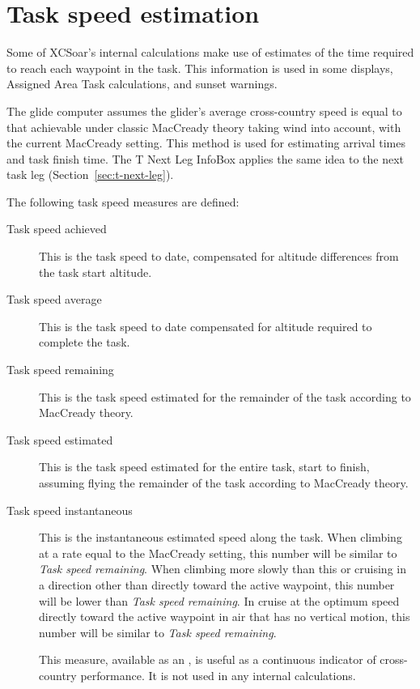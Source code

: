 \section{Task speed estimation}\label{sec:task-speed-estim}

Some of XCSoar's internal calculations make use of estimates of the
time required to reach each waypoint in the task.  This information is
used in some {\InfoBox} displays, Assigned Area Task calculations, and
sunset warnings.

The glide computer assumes the glider's average cross-country speed is
equal to that achievable under classic MacCready theory taking wind
into account, with the current MacCready setting.  This method is used
for estimating arrival times and task finish time.  The T Next Leg
InfoBox applies the same idea to the next task leg
(Section~\ref{sec:t-next-leg}).

The following task speed measures are defined:
\begin{description}
\item[Task speed achieved]  This is the task speed to date, compensated
for altitude differences from the task start altitude.
\item[Task speed average]  This is the task speed to date compensated
for altitude required to complete the task.
\item[Task speed remaining]  This is the task speed estimated for the
  remainder of the task according to MacCready theory.
\item[Task speed estimated]  This is the task speed estimated for the entire 
task, start to finish, assuming flying the remainder of the task according 
to MacCready theory.
\item[Task speed instantaneous]  This is the instantaneous estimated speed 
along the task.  When climbing at a rate equal to the MacCready setting, this 
number will be similar to \emph{Task speed remaining}.  When climbing more slowly 
than this or cruising in a direction other than directly toward the active 
waypoint, this number will be lower than \emph{Task speed remaining}.  In cruise 
at the optimum speed directly toward the active waypoint in air that has no 
vertical motion, this number will be similar to \emph{Task speed remaining}.

This measure, available as an {\InfoBox}, is useful as a continuous
indicator of cross-country performance.  It is not used in any
internal calculations.
\end{description}

